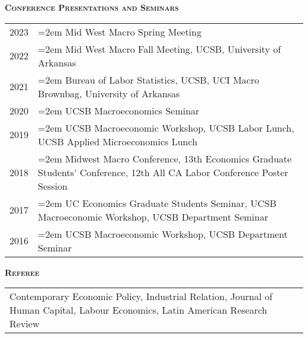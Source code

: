 \documentclass[11pt]{article}
\newenvironment{rSection}[1]{ %
  {\large\bf\textsc{#1}}
  \vspace{0.15cm}
  \begin{list}{}{ %
    \setlength{\leftmargin}{1.5em} %
    \setlength{\rightmargin}{1.5em}
  }
  \item[]
}{
  \end{list}
  \vspace{0.15cm}
}
\begin{document}
\begin{rSection}{Conference Presentations and Seminars}
\begin{tabularx}{\linewidth}{l >{\hangindent=2em}X}
2023 & Mid West Macro Spring Meeting\\
2022 & Mid West Macro Fall Meeting, UCSB, University of Arkansas\\
2021 & Bureau of Labor Statistics, UCSB, UCI Macro Brownbag, University of Arkansas \\
2020 & UCSB Macroeconomics Seminar\\
2019 & UCSB Macroeconomic Workshop, UCSB Labor Lunch, UCSB Applied Microeconomics Lunch\\
2018 & Midwest Macro Conference, 13th Economics Graduate Students' Conference, 12th All CA Labor Conference Poster Session\\
2017 & UC Economics Graduate Students Seminar, UCSB Macroeconomic Workshop, UCSB Department Seminar\\
2016 & UCSB Macroeconomic Workshop, UCSB Department Seminar\\
\end{tabularx}
\end{rSection}

\begin{rSection}{Referee}
\begin{tabularx}{\linewidth}{X}
Contemporary Economic Policy, Industrial Relation, Journal of Human Capital, Labour Economics, Latin American Research Review
\end{tabularx}
\end{rSection}
\end{document}
